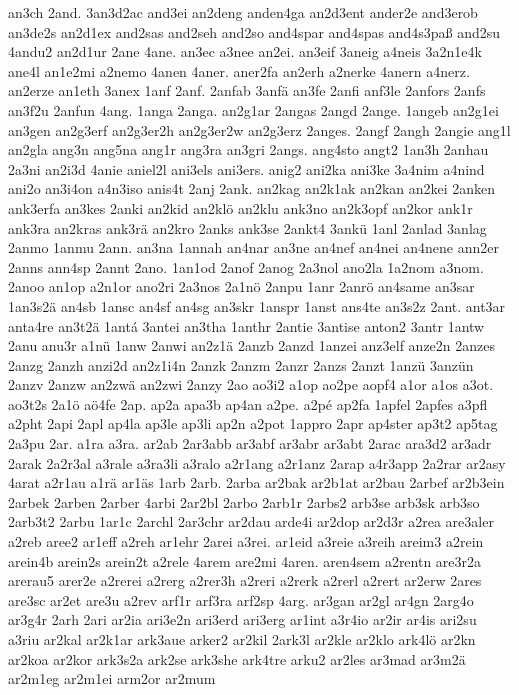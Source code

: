 {an3ch
2and.
3an3d2ac
and3ei
an2deng
anden4ga
an2d3ent
ander2e
and3erob
an3de2s
an2d1ex
and2sas
and2seh
and2so
and4spar
and4spas
and4s3paß
and2su
4andu2
an2d1ur
2ane
4ane.
an3ec
a3nee
an2ei.
an3eif
3aneig
a4neis
3a2n1e4k
ane4l
an1e2mi
a2nemo
4anen
4aner.
aner2fa
an2erh
a2nerke
4anern
a4nerz.
an2erze
an1eth
3anex
1anf
2anf.
2anfab
3anfä
an3fe
2anfi
anf3le
2anfors
2anfs
an3f2u
2anfun
4ang.
1anga
2anga.
an2g1ar
2angas
2angd
2ange.
1angeb
an2g1ei
an3gen
an2g3erf
an2g3er2h
an2g3er2w
an2g3erz
2anges.
2angf
2angh
2angie
ang1l
an2gla
ang3n
ang5na
ang1r
ang3ra
an3gri
2angs.
ang4sto
angt2
1an3h
2anhau
2a3ni
an2i3d
4anie
aniel2l
ani3els
ani3ers.
anig2
ani2ka
ani3ke
3a4nim
a4nind
ani2o
an3i4on
a4n3iso
anis4t
2anj
2ank.
an2kag
an2k1ak
an2kan
an2kei
2anken
ank3erfa
an3kes
2anki
an2kid
an2klö
an2klu
ank3no
an2k3opf
an2kor
ank1r
ank3ra
an2kras
ank3rä
an2kro
2anks
ank3se
2ankt4
3ankü
1anl
2anlad
3anlag
2anmo
1anmu
2ann.
an3na
1annah
an4nar
an3ne
an4nef
an4nei
an4nene
ann2er
2anns
ann4sp
2annt
2ano.
1an1od
2anof
2anog
2a3nol
ano2la
1a2nom
a3nom.
2anoo
an1op
a2n1or
ano2ri
2a3nos
2a1nö
2anpu
1anr
2anrö
an4same
an3sar
1an3s2ä
an4sb
1ansc
an4sf
an4sg
an3skr
1anspr
1anst
ans4te
an3s2z
2ant.
ant3ar
anta4re
an3t2ä
1antá
3antei
an3tha
1anthr
2antie
3antise
anton2
3antr
1antw
2anu
anu3r
a1nü
1anw
2anwi
an2z1ä
2anzb
2anzd
1anzei
anz3elf
anze2n
2anzes
2anzg
2anzh
anzi2d
an2z1i4n
2anzk
2anzm
2anzr
2anzs
2anzt
1anzü
3anzün
2anzv
2anzw
an2zwä
an2zwi
2anzy
2ao
ao3i2
a1op
ao2pe
aopf4
a1or
a1os
a3ot.
ao3t2s
2a1ö
aö4fe
2ap.
ap2a
apa3b
ap4an
a2pe.
a2pé
ap2fa
1apfel
2apfes
a3pfl
a2pht
2api
2apl
ap4la
ap3le
ap3li
ap2n
a2pot
1appro
2apr
ap4ster
ap3t2
ap5tag
2a3pu
2ar.
a1ra
a3ra.
ar2ab
2ar3abb
ar3abf
ar3abr
ar3abt
2arac
ara3d2
ar3adr
2arak
2a2r3al
a3rale
a3ra3li
a3ralo
a2r1ang
a2r1anz
2arap
a4r3app
2a2rar
ar2asy
4arat
a2r1au
a1rä
ar1äs
1arb
2arb.
2arba
ar2bak
ar2b1at
ar2bau
2arbef
ar2b3ein
2arbek
2arben
2arber
4arbi
2ar2bl
2arbo
2arb1r
2arbs2
arb3se
arb3sk
arb3so
2arb3t2
2arbu
1ar1c
2archl
2ar3chr
ar2dau
arde4i
ar2dop
ar2d3r
a2rea
are3aler
a2reb
aree2
ar1eff
a2reh
ar1ehr
2arei
a3rei.
ar1eid
a3reie
a3reih
areim3
a2rein
arein4b
arein2s
arein2t
a2rele
4arem
are2mi
4aren.
aren4sem
a2rentn
are3r2a
arerau5
arer2e
a2rerei
a2rerg
a2rer3h
a2reri
a2rerk
a2rerl
a2rert
ar2erw
2ares
are3sc
ar2et
are3u
a2rev
arf1r
arf3ra
arf2sp
4arg.
ar3gan
ar2gl
ar4gn
2arg4o
ar3g4r
2arh
2ari
ar2ia
ari3e2n
ari3erd
ari3erg
ar1int
a3r4io
ar2ir
ar4is
ari2su
a3riu
ar2kal
ar2k1ar
ark3aue
arker2
ar2kil
2ark3l
ar2kle
ar2klo
ark4lö
ar2kn
ar2koa
ar2kor
ark3s2a
ark2se
ark3she
ark4tre
arku2
ar2les
ar3mad
ar3m2ä
ar2m1eg
ar2m1ei
arm2or
ar2mum
}

